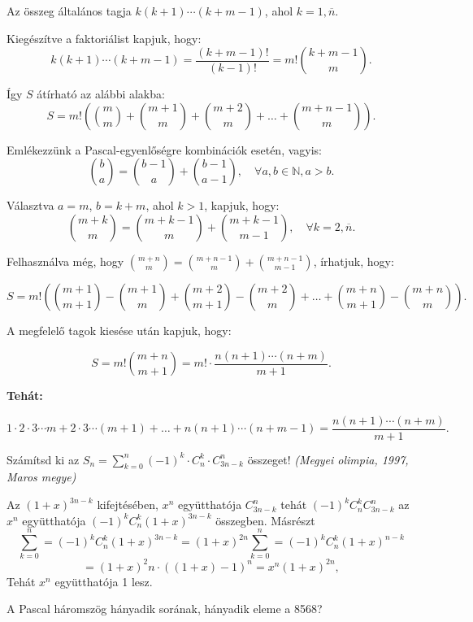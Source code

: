 \begin{solution}
Az összeg általános tagja $k(k+1)\cdots(k+m-1)$, ahol $k=1,\overline{n}$.

Kiegészítve a faktoriálist kapjuk, hogy: 
\[
k(k+1)\cdots(k+m-1)=\frac{(k+m-1)!}{(k-1)!}=m!\binom{k+m-1}{m}.
\]

Így $S$ átírható az alábbi alakba: 
\[
S=m!\left(\binom{m}{m}+\binom{m+1}{m}+\binom{m+2}{m}+\ldots+\binom{m+n-1}{m}\right).
\]

Emlékezzünk a Pascal-egyenlőségre kombinációk esetén, vagyis: 
\[
\binom{b}{a}=\binom{b-1}{a}+\binom{b-1}{a-1},\quad\forall a,b\in\mathbb{N},a>b.
\]

Választva $a=m$, $b=k+m$, ahol $k>1$, kapjuk, hogy: 
\[
\binom{m+k}{m}=\binom{m+k-1}{m}+\binom{m+k-1}{m-1},\quad\forall k=2,\overline{n}.
\]

Felhasználva még, hogy $\binom{m+n}{m}=\binom{m+n-1}{m}+\binom{m+n-1}{m-1}$,
írhatjuk, hogy:

\[
S=m!\left(\binom{m+1}{m+1}-\binom{m+1}{m}+\binom{m+2}{m+1}-\binom{m+2}{m}+\ldots+\binom{m+n}{m+1}-\binom{m+n}{m}\right).
\]

A megfelelő tagok kiesése után kapjuk, hogy:

\[
S=m!\binom{m+n}{m+1}=m!\cdot\frac{n(n+1)\cdots(n+m)}{m+1}.
\]

\bigskip{}

\textbf{Tehát:}

\[
1\cdot2\cdot3\cdots m+2\cdot3\cdots(m+1)+\ldots+n(n+1)\cdots(n+m-1)=\frac{n(n+1)\cdots(n+m)}{m+1}.
\]
\end{solution}
\begin{extraproblem}
Számítsd ki az $S_{n}=\sum_{k=0}^{n}(-1)^{k}\cdot C_{n}^{k}\cdot C_{3n-k}^{n}$
összeget! \emph{(Megyei olimpia, 1997, Maros megye)}
\end{extraproblem}

\begin{solution}
Az $(1+x)^{3n-k}$ kifejtésében, $x^{n}$ együtthatója $C_{3n-k}^{n}$
tehát $(-1)^{k}C_{n}^{k}C_{3n-k}^{n}$ az $x^{n}$ együtthatója $(-1)^{k}C_{n}^{k}(1+x)^{3n-k}$
összegben. Másrészt 
\[
\sum_{k=0}^{n}=(-1)^{k}C_{n}^{k}(1+x)^{3n-k}=(1+x)^{2n}\sum_{k=0}^{n}=(-1)^{k}C_{n}^{k}(1+x)^{n-k}
\]
\[
=(1+x)^{2}n\cdot((1+x)-1)^{n}=x^{n}(1+x)^{2n},
\]
Tehát $x^{n}$ együtthatója 1 lesz. 
\end{solution}
\begin{extraproblem}
A Pascal háromszög hányadik sorának, hányadik eleme a 8568? 
\end{extraproblem}

